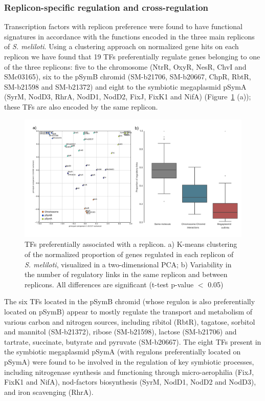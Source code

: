 \subsubsection{Replicon-specific regulation and cross-regulation}
Transcription factors with replicon preference were found to have functional signatures in accordance with the functions encoded in the three main replicons of \textit{S. meliloti}.
 Using a clustering approach on normalized gene hits on each replicon we have found that 19 TFs preferentially regulate genes belonging to one of the three replicons: five to the chromosome (NtrR, OxyR, NesR, ChvI and SMc03165), six to the pSymB chromid (SM-b21706, SM-b20667, ChpR, RbtR, SM-b21598 and SM-b21372) and eight to the symbiotic megaplasmid pSymA (SyrM, NodD3, RhrA, NodD1, NodD2, FixJ, FixK1 and NifA) (Figure~\ref{fig:reg5} (a)); these TFs are also encoded by the same replicon.
\begin{figure}[!tb]
	\centering
	\includegraphics[width=1\textwidth]{./figures/Appendix_1/5_reg}
  	\caption{\label{fig:reg5} TFs preferentially associated with a replicon. a) K-means clustering of the normalized proportion of genes regulated in each replicon of \textit{S. meliloti}, visualized in a two-dimensional PCA; b) Variability in the number of regulatory links in the same replicon and between replicons. All differences are significant (t-test p-value $<$ 0.05)}
\end{figure}
The six TFs located in the pSymB chromid (whose regulon is also preferentially located on pSymB) appear to mostly regulate the transport and metabolism of various carbon and nitrogen sources, including ribitol (RbtR), tagatose, sorbitol and mannitol (SM-b21372), ribose (SM-b21598), lactose (SM-b21706) and tartrate, succinate, butyrate and pyruvate (SM-b20667).
 The eight TFs present in the symbiotic megaplasmid pSymA (with regulons preferentially located on pSymA) were found to be involved in the regulation of key symbiotic processes, including nitrogenase synthesis and functioning through micro-aerophilia (FixJ, FixK1 and NifA), nod-factors biosynthesis (SyrM, NodD1, NodD2 and NodD3), and iron scavenging (RhrA).

